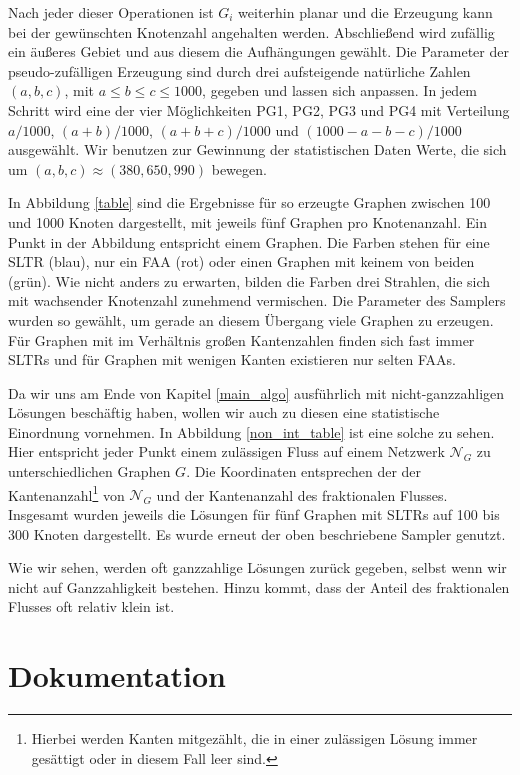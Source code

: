 Nach jeder dieser Operationen ist $G_i$ weiterhin planar und die Erzeugung kann bei der gewünschten Knotenzahl angehalten werden. Abschließend wird zufällig ein äußeres Gebiet und aus diesem die Aufhängungen gewählt. Die Parameter der pseudo-zufälligen Erzeugung sind durch drei aufsteigende natürliche Zahlen $(a,b,c)$, mit $a\leq b\leq c\leq 1000$, gegeben und lassen sich anpassen. In jedem Schritt wird eine der vier Möglichkeiten PG1, PG2, PG3 und PG4 mit Verteilung $a/1000$, $(a+b)/1000$, $(a+b+c)/1000$ und $(1000-a-b-c)/1000$ ausgewählt. Wir benutzen zur Gewinnung der statistischen Daten Werte, die sich um $(a,b,c) \approx (380,650,990)$ bewegen.



In Abbildung \ref{table} sind die Ergebnisse für so erzeugte Graphen zwischen 100 und 1000 Knoten dargestellt, mit jeweils fünf Graphen pro Knotenanzahl. Ein Punkt in der Abbildung entspricht einem Graphen. Die Farben stehen für eine SLTR (blau), nur ein FAA (rot) oder einen Graphen mit keinem von beiden (grün). 
Wie nicht anders zu erwarten, bilden die Farben drei Strahlen, die sich mit wachsender Knotenzahl zunehmend vermischen. Die Parameter des Samplers wurden so gewählt, um gerade an diesem Übergang viele Graphen zu erzeugen. Für Graphen mit im Verhältnis großen Kantenzahlen finden sich fast immer SLTRs und für Graphen mit wenigen Kanten existieren nur selten FAAs.

Da wir uns am Ende von Kapitel \ref{main_algo} ausführlich mit nicht-ganzzahligen Lösungen beschäftig haben, wollen wir auch zu diesen eine statistische Einordnung vornehmen. In Abbildung \ref{non_int_table} ist eine solche zu sehen. Hier entspricht jeder Punkt einem zulässigen Fluss auf einem Netzwerk $\mathcal{N}_G$ zu unterschiedlichen Graphen $G$. Die Koordinaten entsprechen der der Kantenanzahl\footnote{Hierbei werden Kanten mitgezählt, die in einer zulässigen Lösung immer gesättigt oder in diesem Fall leer sind.} von $\mathcal{N}_G$ und der Kantenanzahl des fraktionalen Flusses. Insgesamt wurden jeweils die Lösungen für fünf Graphen mit SLTRs auf 100 bis 300 Knoten dargestellt. Es wurde erneut der oben beschriebene Sampler genutzt.

Wie wir sehen, werden oft ganzzahlige Lösungen zurück gegeben, selbst wenn wir nicht auf Ganzzahligkeit bestehen. Hinzu kommt, dass der Anteil des fraktionalen Flusses oft relativ klein ist.


\section{Dokumentation}

